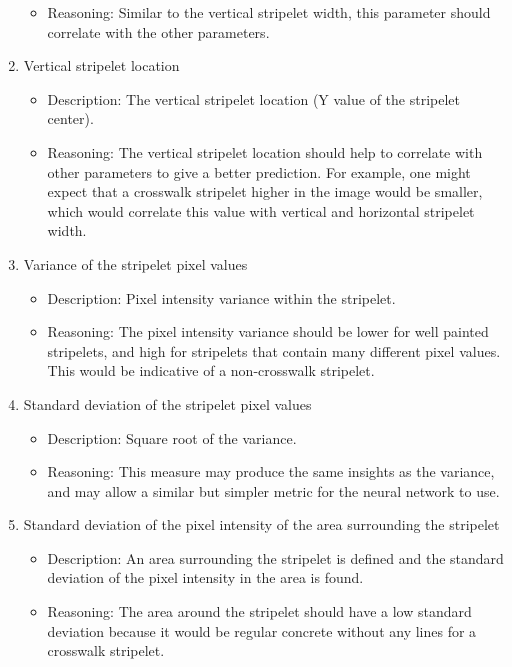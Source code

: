 \documentclass[12pt]{ucthesis}
\begin{document}
\begin{enumerate}
\begin{itemize}
     \item Reasoning: Similar to the vertical stripelet width, this parameter should correlate with the other parameters.
   \end{itemize}
   \item Vertical stripelet location
   \begin{itemize}
     \item Description: The vertical stripelet location (Y value of the stripelet center).
     \item Reasoning: The vertical stripelet location should help to correlate with other parameters to give a better prediction. For example, one might expect that a crosswalk stripelet higher in the image would be smaller, which would correlate this value with vertical and horizontal stripelet width. 
   \end{itemize}
   \item Variance of the stripelet pixel values
   \begin{itemize}
     \item Description: Pixel intensity variance within the stripelet.
     \item Reasoning: The pixel intensity variance should be lower for well painted stripelets, and high for stripelets that contain many different pixel values. This would be indicative of a non-crosswalk stripelet. 
   \end{itemize}
   \item Standard deviation of the stripelet pixel values
   \begin{itemize}
     \item Description: Square root of the variance.
     \item Reasoning: This measure may produce the same insights as the variance, and may allow a similar but simpler metric for the neural network to use.
   \end{itemize}
      \item Standard deviation of the pixel intensity of the area surrounding the stripelet
   \begin{itemize}
     \item Description: An area surrounding the stripelet is defined and the standard deviation of the pixel intensity in the area is found.
     \item Reasoning: The area around the stripelet should have a low standard deviation because it would be regular concrete without any lines for a crosswalk stripelet.
   \end{itemize}

\end{enumerate}
\end{document}
